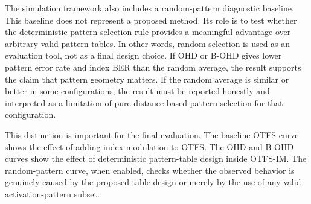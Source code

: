 The simulation framework also includes a random-pattern diagnostic baseline. This baseline does not represent a proposed method. Its role is to test whether the deterministic pattern-selection rule provides a meaningful advantage over arbitrary valid pattern tables. In other words, random selection is used as an evaluation tool, not as a final design choice. If OHD or B-OHD gives lower pattern error rate and index BER than the random average, the result supports the claim that pattern geometry matters. If the random average is similar or better in some configurations, the result must be reported honestly and interpreted as a limitation of pure distance-based pattern selection for that configuration.

This distinction is important for the final evaluation. The baseline OTFS curve shows the effect of adding index modulation to OTFS. The OHD and B-OHD curves show the effect of deterministic pattern-table design inside OTFS-IM. The random-pattern curve, when enabled, checks whether the observed behavior is genuinely caused by the proposed table design or merely by the use of any valid activation-pattern subset.
